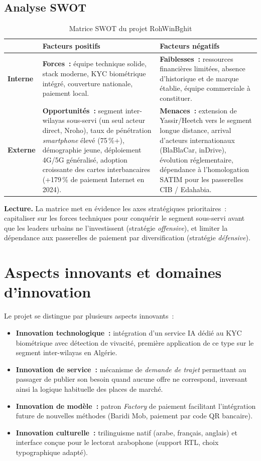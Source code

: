 \subsection{Analyse SWOT}

\begin{table}[H]
\centering
\begin{tabularx}{\textwidth}{|>{\columncolor{rohlight}}l|X|X|}
\hline
 & \textbf{Facteurs positifs} & \textbf{Facteurs négatifs} \\
\hline
\textbf{Interne} & \textbf{Forces~:} équipe technique solide, stack moderne, KYC biométrique intégré, couverture nationale, paiement local. & \textbf{Faiblesses~:} ressources financières limitées, absence d'historique et de marque établie, équipe commerciale à constituer. \\
\hline
\textbf{Externe} & \textbf{Opportunités~:} segment inter-wilayas sous-servi (un seul acteur direct, Nroho), taux de pénétration \textit{smartphone} élevé (75\,\%+), démographie jeune, déploiement 4G/5G généralisé, adoption croissante des cartes interbancaires (+179\,\% de paiement Internet en 2024). & \textbf{Menaces~:} extension de Yassir/Heetch vers le segment longue distance, arrival d'acteurs internationaux (BlaBlaCar, inDrive), évolution réglementaire, dépendance à l'homologation SATIM pour les passerelles CIB / Edahabia. \\
\hline
\end{tabularx}
  \caption{Matrice SWOT du projet RohWinBghit}
\end{table}

\textbf{Lecture.} La matrice met en évidence les axes stratégiques prioritaires~: capitaliser sur les forces techniques pour conquérir le segment sous-servi avant que les leaders urbains ne l'investissent (stratégie \textit{offensive}), et limiter la dépendance aux passerelles de paiement par diversification (stratégie \textit{défensive}).

\section{Aspects innovants et domaines d'innovation}

Le projet se distingue par plusieurs aspects innovants~:
\begin{itemize}
  \item \textbf{Innovation technologique~:} intégration d'un service IA dédié au KYC biométrique avec détection de vivacité, première application de ce type sur le segment inter-wilayas en Algérie.
  \item \textbf{Innovation de service~:} mécanisme de \textit{demande de trajet} permettant au passager de publier son besoin quand aucune offre ne correspond, inversant ainsi la logique habituelle des places de marché.
  \item \textbf{Innovation de modèle~:} patron \textit{Factory} de paiement facilitant l'intégration future de nouvelles méthodes (Baridi Mob, paiement par code QR bancaire).
  \item \textbf{Innovation culturelle~:} trilinguisme natif (arabe, français, anglais) et interface conçue pour le lectorat arabophone (support RTL, choix typographique adapté).
\end{itemize}

